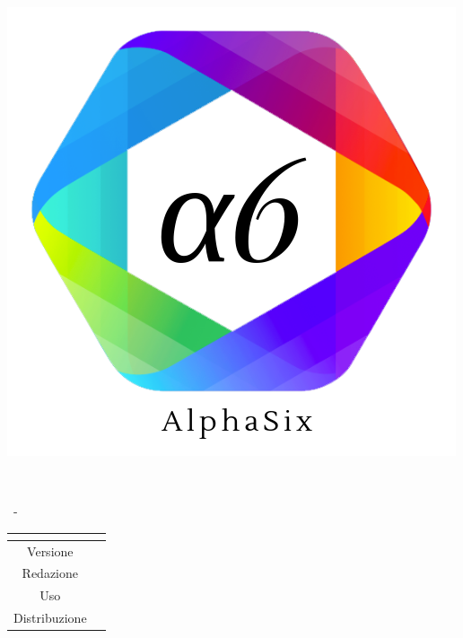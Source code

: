 \documentclass[a4paper, oneside, openany]{article}
\begin{document}
\begin{titlepage}
	\begin{center}
		
		\begin{center}
			\centerline{\includegraphics[scale=0.24]{../../template/icons/a6.png}}
		\end{center}
		
		\vspace{1cm}
		
		\begin{Huge}
			\textbf{\Titolo} \\
		\end{Huge}
		
		\vspace{9pt}  
		
		\begin{large}
			\Gruppo \ - \Data
		\end{large}	  
		
		\vspace{15pt}
		
		\bgroup
		\def\arraystretch{1.3}
		\centering
		\begin{tabular}{c|L{5cm}}
			 \\ \hline
			Versione &  \Versione \\
			Redazione & \ACapoRedazione \\
		\end{tabular}
		\egroup
		

\end{center}
\end{titlepage}
\end{document}
